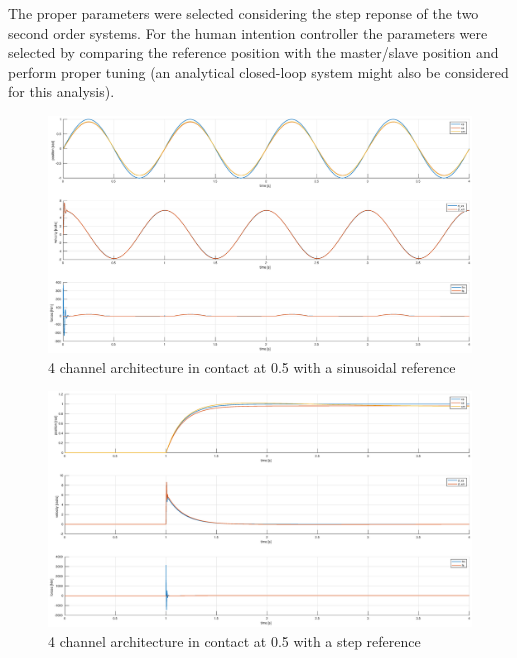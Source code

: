 \documentclass[a4paper,12pt]{article}
\begin{document}
\bigskip
\noindent The proper parameters were selected considering the step reponse of the two second order systems. For the human intention controller the parameters were selected by comparing the reference position with the master/slave position and perform proper tuning (an analytical closed-loop system might also be considered for this analysis).
\bigskip 

\begin{figure}[H]
    \begin{center}
        \hspace*{-4.2cm}
        \includegraphics[scale=0.4]{images/four_contact_05.eps}
    \end{center}
    \caption{4 channel architecture in contact at 0.5 with a sinusoidal reference}
    \label{fig:four_cotact}
\end{figure}

\begin{figure}[H]
    \begin{center}
        \hspace*{-4.2cm}
        \includegraphics[scale=0.4]{images/four_step_contact_05.eps}
    \end{center}
    \caption{4 channel architecture in contact at 0.5 with a step reference}
    \label{fig:four_step}
\end{figure}
\end{document}
